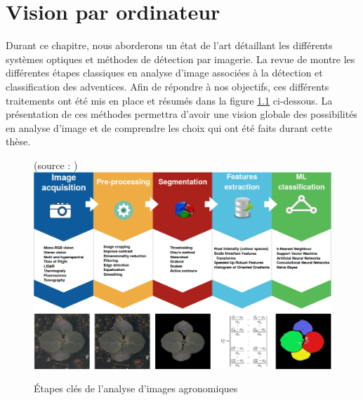 \documentclass[../thesis.tex]{subfiles}
\begin{document}
    \chapter{Vision par ordinateur}
    \label{chap:computer-vision}
    
    
    
    \par Durant ce chapitre, nous aborderons un état de l'art détaillant les différents systèmes optiques et méthodes de détection par imagerie. La revue de \cite{pmid29048559} montre les différentes étapes classiques en analyse d'image associées à la détection et classification des adventices. Afin de répondre à nos objectifs, ces différents traitements ont été mis en place et résumés dans la figure \ref{fig:03-keys-steps} ci-dessous. La présentation de ces méthodes permettra d'avoir une vision globale des possibilités en analyse d'image et de comprendre les choix qui ont été faits durant cette thèse.
    
    \vfill
    \begin{figure}[H]
        \centering
        {\scriptsize (source : \cite{pmid29048559})} \\
        \includegraphics[width=\linewidth]{img/biblio/keys-steps}
        \caption{Étapes clés de l'analyse d'images agronomiques}
        \label{fig:03-keys-steps}
    \end{figure}
    \vfill
    
\end{document}
